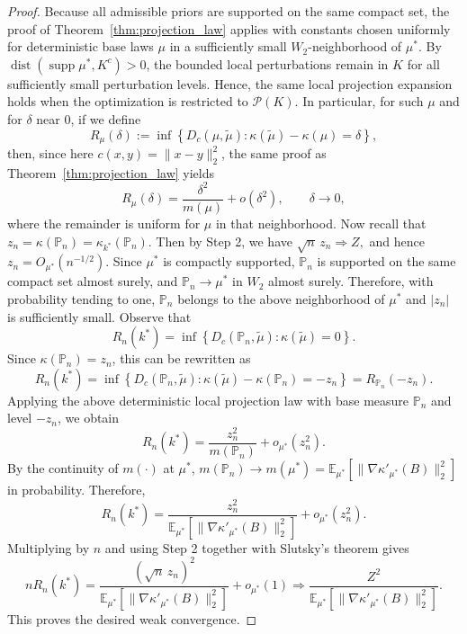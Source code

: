 \documentclass[11pt]{article}
\theoremstyle{definition}
\newcommand{\E}{\mathbb{E}}
\begin{document}
\begin{proof}
{Because all admissible priors are supported on the same compact set, the proof of Theorem~\ref{thm:projection_law} applies with constants chosen uniformly for deterministic base laws $\mu$ in a sufficiently small $W_2$-neighborhood of $\mu^*$. By $\operatorname{dist}(\operatorname{supp}\mu^*,K^c)>0$, the bounded local perturbations remain in $K$ for all sufficiently small perturbation levels. Hence, the same local projection expansion holds when the optimization is restricted to $\mathcal{P}(K)$. In particular, for such $\mu$ and for $\delta$ near $0$, if we define
\[
R_{\mu}(\delta)
:=
\inf\left\{
D_c(\mu,\tilde{\mu})
:
\kappa(\tilde{\mu})-\kappa(\mu)=\delta
\right\},
\]
then, since here $c(x,y)=\|x-y\|_2^2$, the same proof as Theorem~\ref{thm:projection_law} yields
\[
R_{\mu}(\delta)
=
\frac{\delta^2}{m(\mu)}
+
o(\delta^2),
\qquad \delta\to 0,
\]
where the remainder is uniform for $\mu$ in that neighborhood.
Now recall that $z_n = \kappa(\mathbb{P}_n)=\kappa_{k^*}(\mathbb{P}_n)$. Then by Step 2, we have $\sqrt{n}\, z_n \Rightarrow Z,$
and hence $z_n = O_{\mu^*}(n^{-1/2})$. Since $\mu^*$ is compactly supported, $\mathbb{P}_n$ is supported on the same compact set almost surely, and $\mathbb{P}_n \to \mu^*$ in $W_2$ almost surely. Therefore, with probability tending to one, $\mathbb{P}_n$ belongs to the above neighborhood of $\mu^*$ and $|z_n|$ is sufficiently small.
Observe that
\[
R_n(k^*)
=
\inf\left\{
D_c(\mathbb{P}_n,\tilde{\mu})
:
\kappa(\tilde{\mu})=0
\right\}.
\]
Since $\kappa(\mathbb{P}_n)=z_n$, this can be rewritten as
\[
R_n(k^*)
=
\inf\left\{
D_c(\mathbb{P}_n,\tilde{\mu})
:
\kappa(\tilde{\mu})-\kappa(\mathbb{P}_n)=-z_n
\right\}
=
R_{\mathbb{P}_n}(-z_n).
\]
Applying the above deterministic local projection law with base measure $\mathbb{P}_n$ and level $-z_n$, we obtain
\[
R_n(k^*)
=
\frac{z_n^2}{m(\mathbb{P}_n)}
+
o_{\mu^*}(z_n^2).
\]
By the continuity of $m(\cdot)$ at $\mu^*$, $m(\mathbb{P}_n)\to m(\mu^*)
=
\E_{\mu^*}\!\left[\|\nabla \kappa'_{\mu^*}(B)\|_2^2\right]$ in probability.
Therefore,
\[
R_n(k^*)
=
\frac{z_n^2}{\E_{\mu^*}[\|\nabla \kappa'_{\mu^*}(B)\|_2^2]}
+
o_{\mu^*}(z_n^2).
\]
Multiplying by $n$ and using Step 2 together with Slutsky's theorem gives
\[
nR_n(k^*)
=
\frac{(\sqrt{n}\, z_n)^2}{\E_{\mu^*}[\|\nabla \kappa'_{\mu^*}(B)\|_2^2]}
+
o_{\mu^*}(1)
\Rightarrow
\frac{Z^2}{\E_{\mu^*}[\|\nabla \kappa'_{\mu^*}(B)\|_2^2]}.
\]
This proves the desired weak convergence.}


\end{proof}
\end{document}

